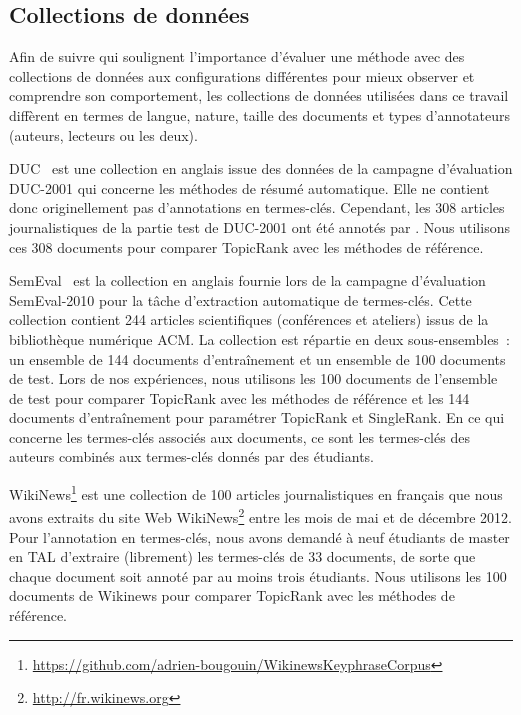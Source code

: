       \subsection{Collections de données}
      \label{subsec:main-automatic_keyphrase_annotation-unsupervised_automatic_keyphrase_extraction-evaluation-evaluation_data}
        Afin de suivre  qui soulignent
        l'importance d'évaluer une méthode avec des collections de données aux
        configurations différentes pour mieux observer et comprendre son
        comportement, les collections de données utilisées dans ce travail
        diffèrent en termes de langue, nature, taille des documents et types
        d'annotateurs (auteurs, lecteurs ou les deux).

        DUC~\cite{over2001duc} est une collection en anglais issue des données
        de la campagne d'évaluation DUC-2001 qui concerne les méthodes de résumé
        automatique. Elle ne contient donc originellement pas d'annotations en
        termes-clés. Cependant, les 308 articles journalistiques de la partie
        test de DUC-2001 ont été annotés par . Nous
        utilisons ces 308 documents pour comparer TopicRank avec les méthodes de
        référence.

        SemEval~\cite{kim2010semeval} est la collection en anglais fournie lors
        de la campagne d'évaluation SemEval-2010 pour la tâche d'extraction
        automatique de termes-clés. Cette collection contient 244 articles
        scientifiques (conférences et ateliers) issus de la bibliothèque
        numérique ACM. La collection est répartie en deux sous-ensembles~: un
        ensemble de 144 documents d'entraînement et un ensemble de 100 documents
        de test. Lors de nos expériences, nous utilisons les 100 documents de
        l'ensemble de test pour comparer TopicRank avec les méthodes de
        référence et les 144 documents d'entraînement pour paramétrer TopicRank
        et SingleRank. En ce qui concerne les termes-clés associés aux
        documents, ce sont les termes-clés des auteurs combinés aux termes-clés
        donnés par des étudiants.

        WikiNews\footnote{\url{https://github.com/adrien-bougouin/WikinewsKeyphraseCorpus}}
        est une collection de 100 articles journalistiques en français que nous
        avons extraits du site Web
        WikiNews\footnote{\url{http://fr.wikinews.org}} entre les mois de mai et
        de décembre 2012. Pour l'annotation en termes-clés, nous avons demandé à
        neuf étudiants de master en TAL d'extraire (librement) les termes-clés
        de 33 documents, de sorte que chaque document soit annoté par au moins
        trois étudiants. Nous utilisons les 100 documents de Wikinews pour
        comparer TopicRank avec les méthodes de référence.

